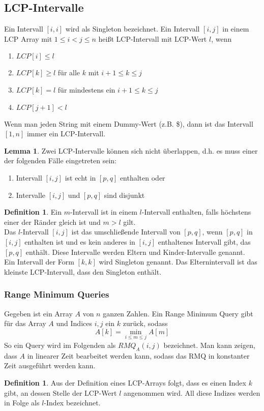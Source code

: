 \documentclass[a4paper, 12pt]{article}
\theoremstyle{plain}
\theoremstyle{definition}
\newtheorem{definition}[theorem]{Definition} %
\theoremstyle{lemma}
\newtheorem{lemma}[theorem]{Lemma}
\theoremstyle{remark}
\theoremstyle{corollary}
\theoremstyle{example}
\begin{document}
	\subsection{LCP-Intervalle}
	Ein Intervall $[i,i]$ wird als Singleton bezeichnet. Ein Intervall $[i,j]$ in einem LCP Array mit $1 \leq i < j \leq n$ heißt LCP-Intervall mit LCP-Wert $l$, wenn \begin{enumerate}
		\item $LCP[i] \leq l$
		\item $LCP[k]\geq l$ für alle $k$ mit $i+1 \leq k \leq j$
		\item $LCP[k] = l$ für mindestens ein $i+1 \leq k \leq j$
		\item $LCP[j+1] < l$
	\end{enumerate}
	Wenn man jeden String mit einem Dummy-Wert (z.B. \$), dann ist das Intervall $[1,n]$ immer ein LCP-Intervall.
	\begin{lemma}
		Zwei LCP-Intervalle können sich nicht überlappen, d.h. es muss einer der folgenden Fälle eingetreten sein:
		\begin{enumerate}
			\item Intervall $[i,j]$ ist echt in $[p,q]$ enthalten oder 
			\item Intervalle $[i,j]$ und $[p,q]$ sind disjunkt
		\end{enumerate}
	\end{lemma}
	\begin{definition}
		Ein $m$-Intervall ist in einem $l$-Intervall enthalten, falls höchstens einer der Ränder gleich ist und $m>l$ gilt.\\
		Das $l$-Intervall $[i,j]$ ist das umschließende Intervall von $[p,q]$, wenn $[p,q]$ in $[i,j]$ enthalten ist und es kein anderes in $[i,j]$ enthaltenes Intervall gibt, das $[p,q]$ enthält. Diese Intervalle werden Eltern und Kinder-Intervalle genannt.\\
		Ein Intervall der Form $[k,k]$ wird Singleton genannt. Das Elternintervall ist das kleinste LCP-Intervall, dass den Singleton enthält.
	\end{definition}
	\subsubsection{Range Minimum Queries}
	Gegeben ist ein Array $A$ von $n$ ganzen Zahlen. Ein Range Minimum Query gibt für das Array $A$ und Indices $i,j$ ein $k$ zurück, sodass \[A[k] = \min_{i\leq m\leq j} A[m]\] 
	So ein Query wird im Folgenden als $RMQ_A(i,j)$ bezeichnet. Man kann zeigen, dass $A$ in linearer Zeit bearbeitet werden kann, sodass das RMQ in konstanter Zeit ausgeführt werden kann.
	\begin{definition}
		Aus der Definition eines LCP-Arrays folgt, dass es einen Index $k$ gibt, an dessen Stelle der LCP-Wert $l$ angenommen wird. All diese Indizes werden in Folge als $l$-Index bezeichnet.
	\end{definition}
\end{document}
